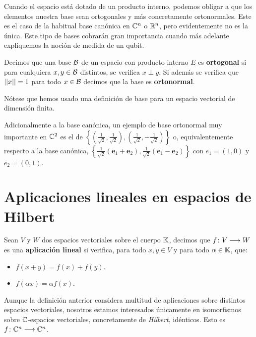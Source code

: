 Cuando el espacio está dotado de un producto interno, podemos obligar a que los elementos nuestra base sean ortogonales y más concretamente ortonormales. Este es el caso de la habitual base canónica en $\mathbb{C}^n$ o $\mathbb{R}^n$, pero evidentemente no es la única. Este tipo de bases cobrarán gran importancia cuando más adelante expliquemos la noción de medida de un qubit.

\begin{definition} Decimos que una base $\mathcal{B}$ de un espacio con producto interno $E$ es \textbf{ortogonal} si para cualquiera $x,y\in\mathcal{B}$ distintos, se verifica $x\perp y$. Si además se verifica que $\left|\left|x\right|\right|=1$ para todo $x\in\mathcal{B}$ decimos que la base es \textbf{ortonormal}.

Nótese que hemos usado una definición de base para un espacio vectorial de dimensión finita.
\end{definition}

\begin{example} Adicionalmente a la base canónica, un ejemplo de base ortonormal muy importante en $\mathbb{C}^2$ es el de $\left\{\left(\frac{1}{\sqrt{2}},\frac{1}{\sqrt{2}}\right),\left(\frac{1}{\sqrt{2}},-\frac{1}{\sqrt{2}}\right)\right\}$ o, equivalentemente respecto a la base canónica, $\left\{\frac{1}{\sqrt{2}}\left(\textbf{e}_1 + \textbf{e}_2\right),\frac{1}{\sqrt{2}}\left(\textbf{e}_1 - \textbf{e}_2\right)\right\}$ con $e_1=(1,0)$ y $e_2=(0,1)$.
\end{example}

\section{Aplicaciones lineales en espacios de Hilbert}

\begin{definition} Sean $V$ y $W$ dos espacios vectoriales sobre el cuerpo $\mathbb{K}$, decimos que $f\colon V\longrightarrow W$ es una \textbf{aplicación lineal} si verifica, para todo $x,y\in V$ y para todo $\alpha\in\mathbb{K}$, que:
\begin{itemize}
\item $f(x+y)=f(x)+f(y)$.
\item $f(\alpha x)=\alpha f(x)$.
\end{itemize}
\end{definition}

Aunque la definición anterior considera multitud de aplicaciones sobre distintos espacios vectoriales, nosotros estamos interesados únicamente en isomorfismos sobre $\mathbb{C}$-espacios vectoriales, concretamente de \textit{Hilbert}, idénticos. Esto es $f\colon \mathbb{C}^n\longrightarrow \mathbb{C}^n$.

